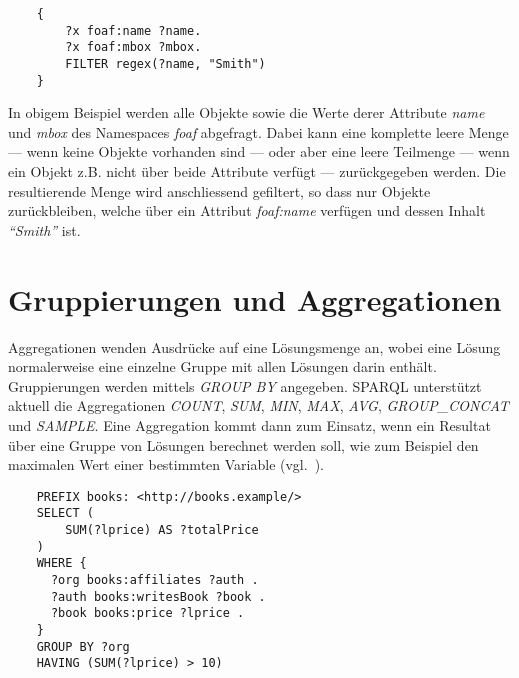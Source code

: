 \lstset{language=XML}
\begin{lstlisting}
    {
        ?x foaf:name ?name.
        ?x foaf:mbox ?mbox.
        FILTER regex(?name, "Smith")
    }
\end{lstlisting}

In obigem Beispiel werden alle Objekte sowie die Werte derer Attribute \textit{name} und \textit{mbox} des Namespaces \textit{foaf} abgefragt. Dabei kann eine komplette leere Menge --- wenn keine Objekte vorhanden sind --- oder aber eine leere Teilmenge --- wenn ein Objekt z.B. nicht über beide Attribute verfügt --- zurückgegeben werden. Die resultierende Menge wird anschliessend gefiltert, so dass nur Objekte zurückbleiben, welche über ein Attribut \textit{foaf:name} verfügen und dessen Inhalt \textit{``Smith''} ist.

\section{Gruppierungen und Aggregationen}
\label{sec:sparql_gruppierungenaggregationen}

Aggregationen wenden Ausdrücke auf eine Lösungsmenge an, wobei eine Lösung normalerweise eine einzelne Gruppe mit allen Lösungen darin enthält. Gruppierungen werden mittels \textit{GROUP BY} angegeben.
SPARQL unterstützt aktuell die Aggregationen \textit{COUNT}, \textit{SUM}, \textit{MIN}, \textit{MAX}, \textit{AVG}, \textit{GROUP\_CONCAT} und \textit{SAMPLE}. Eine Aggregation kommt dann zum Einsatz, wenn ein Resultat über eine Gruppe von Lösungen berechnet werden soll, wie zum Beispiel den maximalen Wert einer bestimmten Variable (vgl.~\cite[11 Aggregates]{w3sparql_querylang}).

\lstset{language=SQL}
\begin{lstlisting}
    PREFIX books: <http://books.example/>
    SELECT (
        SUM(?lprice) AS ?totalPrice
    )
    WHERE {
      ?org books:affiliates ?auth .
      ?auth books:writesBook ?book .
      ?book books:price ?lprice .
    }
    GROUP BY ?org
    HAVING (SUM(?lprice) > 10)
\end{lstlisting}

